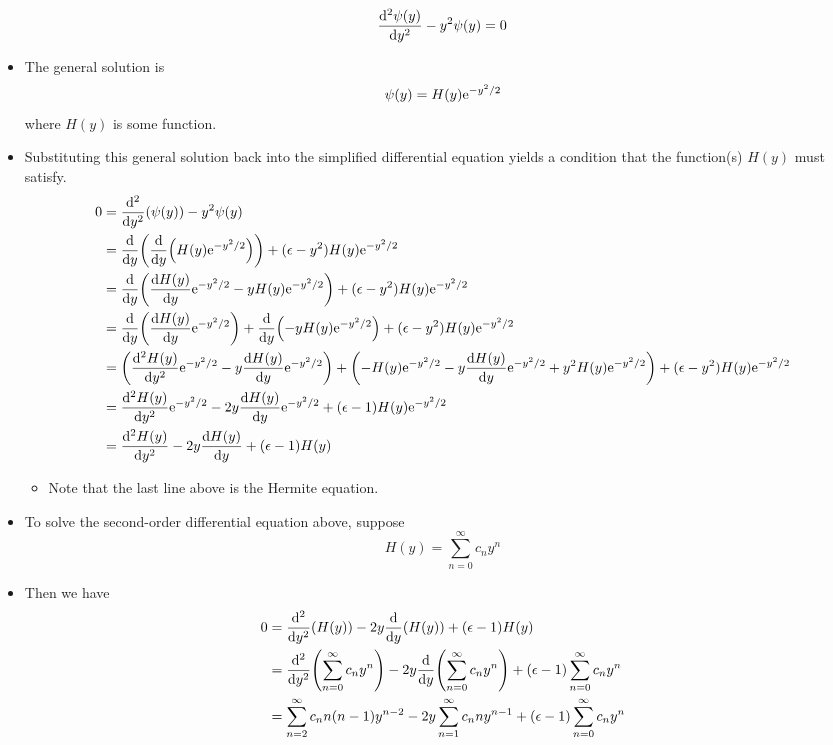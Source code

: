 \documentclass[../notes.tex]{subfiles}
\begin{document}
\begin{itemize}
    \begin{equation*}
        \dv[2]{\psi(y)}{y}-y^2\psi(y) = 0
    \end{equation*}
    \item {}The general solution is
    \begin{equation*}
        \psi(y) = H(y)\e[-y^2/2]
    \end{equation*}
    where $H(y)$ is some function.
    \item Substituting this general solution back into the simplified differential equation yields a condition that the function(s) $H(y)$ must satisfy.
    \begin{align*}
        0 &= \dv[2]{y}(\psi(y))-y^2\psi(y)\\
        &= \dv{y}(\dv{y}(H(y)\e[-y^2/2]))+(\epsilon-y^2)H(y)\e[-y^2/2]\\
        &= \dv{y}(\dv{H(y)}{y}\e[-y^2/2]-yH(y)\e[-y^2/2])+(\epsilon-y^2)H(y)\e[-y^2/2]\\
        &= \dv{y}(\dv{H(y)}{y}\e[-y^2/2])+\dv{y}(-yH(y)\e[-y^2/2])+(\epsilon-y^2)H(y)\e[-y^2/2]\\
        &= \left( \dv[2]{H(y)}{y}\e[-y^2/2]-y\dv{H(y)}{y}\e[-y^2/2] \right)+\left( -H(y)\e[-y^2/2]-y\dv{H(y)}{y}\e[-y^2/2]+y^2H(y)\e[-y^2/2] \right)+(\epsilon-y^2)H(y)\e[-y^2/2]\\
        &= \dv[2]{H(y)}{y}\e[-y^2/2]-2y\dv{H(y)}{y}\e[-y^2/2]+(\epsilon-1)H(y)\e[-y^2/2]\\
        &= \dv[2]{H(y)}{y}-2y\dv{H(y)}{y}+(\epsilon-1)H(y)
    \end{align*}
    \begin{itemize}
        \item Note that the last line above is the Hermite equation.
    \end{itemize}
    \item To solve the second-order differential equation above, suppose
    \begin{equation*}
        H(y) = \sum_{n=0}^\infty c_ny^n
    \end{equation*}
    \item Then we have
    \begingroup
    \allowdisplaybreaks
    \begin{align*}
        0 &= \dv[2]{y}(H(y))-2y\dv{y}(H(y))+(\epsilon-1)H(y)\\
        &= \dv[2]{y}(\sum_{n=0}^\infty c_ny^n)-2y\dv{y}(\sum_{n=0}^\infty c_ny^n)+(\epsilon-1)\sum_{n=0}^\infty c_ny^n\\
        &= \sum_{n=2}^\infty c_nn(n-1)y^{n-2}-2y\sum_{n=1}^\infty c_nny^{n-1}+(\epsilon-1)\sum_{n=0}^\infty c_ny^n\\

\end{align*}
\end{itemize}
\end{document}
